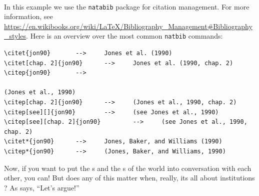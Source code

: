 \documentclass[11pt,letterpaper,oneside]{article} %
\begin{document}
\begin{footnotesize}
\begin{verbatim}


\end{verbatim}
\end{footnotesize}

In this example we use the \texttt{natabib} package for citation management. For more information, see \url{https://en.wikibooks.org/wiki/LaTeX/Bibliography_Management#Bibliography_styles}. Here is an overview over the most common \texttt{natbib} commands:

\begin{verbatim}
\citet{jon90} 	    -->    	Jones et al. (1990)
\citet[chap. 2]{jon90} 	    -->    	Jones et al. (1990, chap. 2)
\citep{jon90} 	    -->    	

(Jones et al., 1990)
\citep[chap. 2]{jon90} 	    -->    	(Jones et al., 1990, chap. 2)
\citep[see][]{jon90} 	    -->    	(see Jones et al., 1990)
\citep[see][chap. 2]{jon90} 	    -->    	(see Jones et al., 1990, chap. 2)
\citet*{jon90} 	    -->    	Jones, Baker, and Williams (1990)
\citep*{jon90} 	    -->    	(Jones, Baker, and Williams, 1990)
\end{verbatim}

Now, if you want to put the \citeauthor{waltz1979}s and the \citeauthor{vasquez1997}s of the world into conversation with each other, you can! But does any of this matter when, really, its all about institutions \citep{keohane2005}? As \citet{risse2000} says, ``Let's argue!'' 





\end{document}
